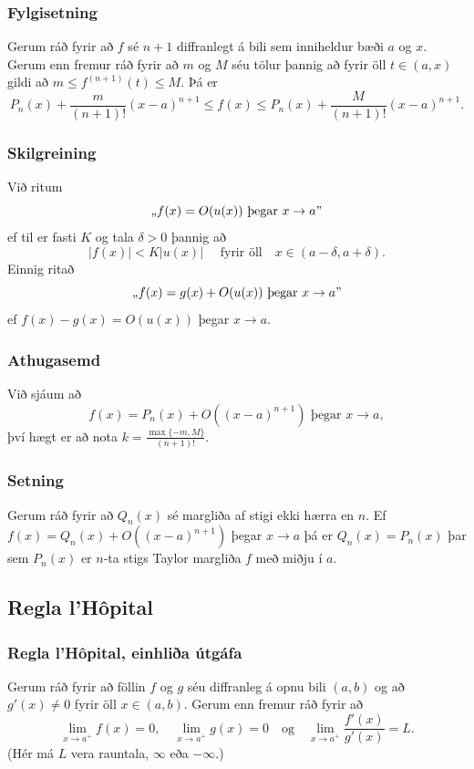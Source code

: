 \documentclass[icelandic,a4paper,12pt]{article}
\begin{document}
\subsubsection{Fylgisetning}   
 Gerum ráð fyrir að
$f$ sé $n+1$ diffranlegt á bili sem inniheldur bæði
$a$ og $x$.  Gerum enn fremur ráð fyrir að $m$ og $M$ séu tölur þannig
 að fyrir öll $t\in (a, x)$ gildi að $m\leq f^{(n+1)}(t)\leq M$. \pause 
 Þá er
$$P_n(x) + \frac{m}{(n+1)!}(x-a)^{n+1} \leq f(x)
\leq P_n(x) + \frac{M}{(n+1)!}(x-a)^{n+1}.$$

\subsubsection{Skilgreining}
Við ritum 
$$\mbox{,,}f(x)=O(u(x)) \mbox{ þegar } x\rightarrow
 a\mbox{\rq\rq}$$
 ef til er fasti $K$ og tala $\delta>0$ þannig að 
$$|f(x)|<K|u(x)|\quad\mbox{ fyrir öll}\quad x\in(a-\delta, a+\delta).$$
\pause
Einnig ritað 
$$\mbox{,,}f(x)=g(x)+O(u(x)) \mbox{ þegar }x\rightarrow a
\mbox{\rq\rq}$$
ef $f(x)-g(x)=O(u(x))$ þegar $x\rightarrow a$.

\subsubsection{Athugasemd}
Við sjáum að 
$$
f(x) = P_n(x) + O((x-a)^{n+1}) \mbox{ þegar } x\rightarrow a,
$$
því hægt er að nota $k = \frac{\max\{-m,M\}}{(n+1)!}$.

\subsubsection{Setning}
Gerum ráð fyrir að $Q_n(x)$ sé margliða af stigi ekki hærra en $n$.
Ef $f(x)=Q_n(x)+O((x-a)^{n+1})$ þegar $x\rightarrow a$ þá er
$Q_n(x)=P_n(x)$ þar sem $P_n(x)$ er $n$-ta stigs Taylor margliða $f$
með miðju í $a$.

\subsection{Regla l'H\^opital}
\subsubsection{Regla l'H\^opital, einhliða útgáfa} 
Gerum ráð fyrir að föllin $f$ og $g$ séu diffranleg á opnu bili $(a,
b)$ og að $g'(x)\neq 0$ fyrir öll $x\in (a, b)$.  \pause 
Gerum enn fremur ráð fyrir að 
$$\lim_{x\rightarrow a^+}f(x)=0, \quad \lim_{x\rightarrow a^+}g(x)=0
\quad\mbox{og}\quad \lim_{x\rightarrow a^+}\frac{f'(x)}{g'(x)}=L.$$
\pause
(Hér má $L$ vera rauntala, $\infty$ eða $-\infty$.) \pause
\end{document}
